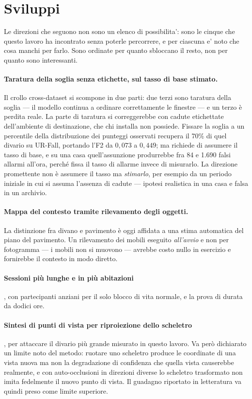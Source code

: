 \section{Sviluppi}
\label{sec:sviluppi}

Le direzioni che seguono non sono un elenco di possibilita': sono le cinque
che questo lavoro ha incontrato senza poterle percorrere, e per ciascuna e'
noto che cosa manchi per farlo. Sono ordinate per quanto sbloccano il resto,
non per quanto sono interessanti.

\paragraph{Taratura della soglia senza etichette, sul tasso di base stimato.} Il crollo cross-dataset si scompone in due parti: due terzi sono taratura della soglia --- il modello continua a ordinare correttamente le finestre --- e un terzo è perdita reale. La parte di taratura si correggerebbe con cadute etichettate dell'ambiente di destinazione, che chi installa non possiede. Fissare la soglia a un percentile della distribuzione dei punteggi osservati recupera il 70\% di quel divario su UR-Fall, portando l'F2 da $0{,}073$ a $0{,}449$; ma richiede di assumere il tasso di base, e su una casa quell'assunzione produrrebbe fra 84 e 1.690 falsi allarmi all'ora, perché fissa il tasso di allarme invece di misurarlo. La direzione promettente non è assumere il tasso ma \emph{stimarlo}, per esempio da un periodo iniziale in cui si assuma l'assenza di cadute --- ipotesi realistica in una casa e falsa in un archivio.

\paragraph{Mappa del contesto tramite rilevamento degli oggetti.} La distinzione fra divano e pavimento è oggi affidata a una stima automatica del piano del pavimento. Un rilevamento dei mobili eseguito \emph{all'avvio} e non per fotogramma --- i mobili non si muovono --- avrebbe costo nullo in esercizio e fornirebbe il contesto in modo diretto.

\paragraph{Sessioni più lunghe e in più abitazioni}, con partecipanti anziani per il solo blocco di vita normale, e la prova di durata da dodici ore.

\paragraph{Sintesi di punti di vista per riproiezione dello scheletro}, per attaccare il divario più grande misurato in questo lavoro. Va però dichiarato un limite noto del metodo: ruotare uno scheletro produce le coordinate di una vista nuova ma non la degradazione di confidenza che quella vista causerebbe realmente, e con auto-occlusioni in direzioni diverse lo scheletro trasformato non imita fedelmente il nuovo punto di vista. Il guadagno riportato in letteratura va quindi preso come limite superiore.

